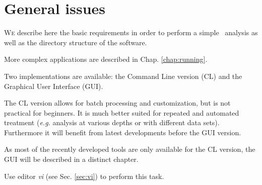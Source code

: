 \chapter{General issues\label{chap:general}}

\lettrine[lines=2, loversize=-0.1, lraise=0.1]{W}{e} describe here the basic requirements in order to perform a simple \diva\, analysis as well as the directory structure of the software. 

More complex applications are described in Chap. \ref{chap:running}.


\minitoc

\newpage %

Two implementations are available: the Command Line version (CL) and the Graphical User Interface (GUI).

The CL version allows for batch processing and customization, but is not practical for beginners. It is much
better suited for repeated and automated treatment (\textit{e.g.} analysis at various depths or with different data sets). Furthermore it will benefit from latest developments before the GUI version.

As most of the recently developed tools are only available for the CL version, the GUI will be described in a distinct chapter.


%
%

\begin{center}
\end{center}


\btips

Use editor \textsl{vi} (see Sec. \ref{sec:vi}) to perform this task.

